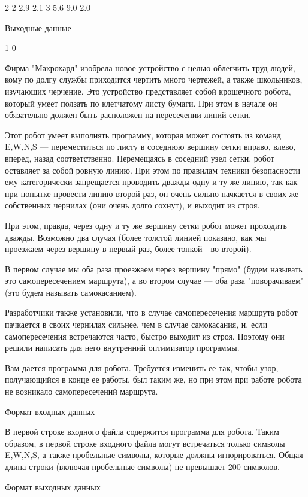 \documentclass[]{article}
\begin{document}
2
2 2.9 2.1
3 5.6 9.0 2.0

Выходные данные

1
0



Фирма "Макрохард" изобрела новое устройство с целью облегчить труд людей, кому по долгу службы приходится чертить много чертежей, а также школьников, изучающих черчение. Это устройство представляет собой крошечного робота, который умеет ползать по клетчатому листу бумаги. При этом в начале он обязательно должен быть расположен на пересечении линий сетки.

Этот робот умеет выполнять программу, которая может состоять из команд E,W,N,S — переместиться по листу в соседнюю вершину сетки вправо, влево, вперед, назад соответственно. Перемещаясь в соседний узел сетки, робот оставляет за собой ровную линию. При этом по правилам техники безопасности ему категорически запрещается проводить дважды одну и ту же линию, так как при попытке провести линию второй раз, он очень сильно пачкается в своих же собственных чернилах (они очень долго сохнут), и выходит из строя.

При этом, правда, через одну и ту же вершину сетки робот может проходить дважды. Возможно два случая (более толстой линией показано, как мы проезжаем через вершину в первый раз, более тонкой - во второй).

В первом случае мы оба раза проезжаем через вершину "прямо" (будем называть это самопересечением маршрута), а во втором случае — оба раза "поворачиваем" (это будем называть самокасанием).

Разработчики также установили, что в случае самопересечения маршрута робот пачкается в своих чернилах сильнее, чем в случае самокасания, и, если самопересечения встречаются часто, быстро выходит из строя. Поэтому они решили написать для него внутренний оптимизатор программы.

Вам дается программа для робота. Требуется изменить ее так, чтобы узор, получающийся в конце ее работы, был таким же, но при этом при работе робота не возникало самопересечений маршрута.

Формат входных данных

В первой строке входного файла содержится программа для робота. Таким образом, в первой строке входного файла могут встречаться только символы E,W,N,S, а также пробельные символы, которые должны игнорироваться. Общая длина строки (включая пробельные символы) не превышает 200 символов.

Формат выходных данных
\end{document}
